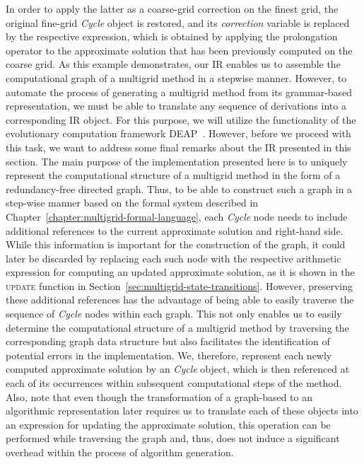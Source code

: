 In order to apply the latter as a coarse-grid correction on the finest grid, the original fine-grid \emph{Cycle} object is restored, and its \emph{correction} variable is replaced by the respective expression, which is obtained by applying the prolongation operator to the approximate solution that has been previously computed on the coarse grid.
As this example demonstrates, our IR enables us to assemble the computational graph of a multigrid method in a stepwise manner.
However, to automate the process of generating a multigrid method from its grammar-based representation, we must be able to translate any sequence of derivations into a corresponding IR object.
For this purpose, we will utilize the functionality of the evolutionary computation framework DEAP~\cite{rainville2012deap}.
However, before we proceed with this task, we want to address some final remarks about the IR presented in this section.
The main purpose of the implementation presented here is to uniquely represent the computational structure of a multigrid method in the form of a redundancy-free directed graph.
Thus, to be able to construct such a graph in a step-wise manner based on the formal system described in Chapter~\ref{chapter:multigrid-formal-language}, each \emph{Cycle} node needs to include additional references to the current approximate solution and right-hand side.
While this information is important for the construction of the graph, it could later be discarded by replacing each such node with the respective arithmetic expression for computing an updated approximate solution, as it is shown in the \textsc{update} function in Section~\ref{sec:multigrid-state-transitions}.
However, preserving these additional references has the advantage of being able to easily traverse the sequence of \emph{Cycle} nodes within each graph.
This not only enables us to easily determine the computational structure of a multigrid method by traversing the corresponding graph data structure but also facilitates the identification of potential errors in the implementation.
We, therefore, represent each newly computed approximate solution by an \emph{Cycle} object, which is then referenced at each of its occurrences within subsequent computational steps of the method.
Also, note that even though the transformation of a graph-based to an algorithmic representation later requires us to translate each of these objects into an expression for updating the approximate solution, this operation can be performed while traversing the graph and, thus, does not induce a significant overhead within the process of algorithm generation.

